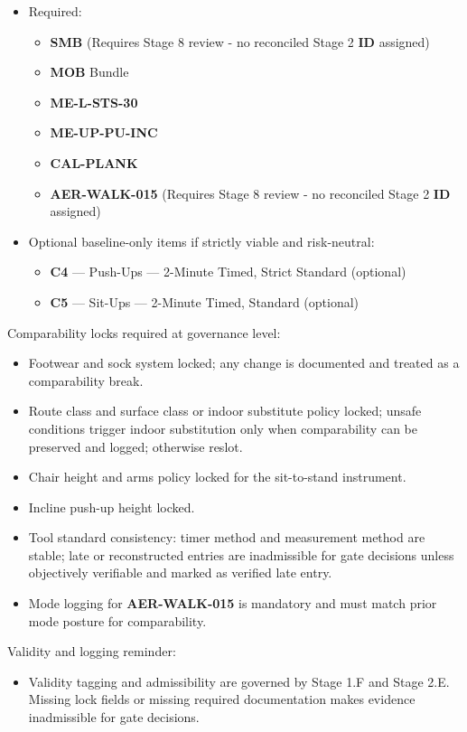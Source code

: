 \documentclass[10pt]{article}
\begin{document}
\begin{landscape}
\begin{itemize}
\item Required:
\begin{itemize}
\item \textbf{SMB} (Requires Stage 8 review - no reconciled Stage 2 \textbf{ID} assigned)
\item \textbf{MOB} Bundle
\item \textbf{ME-L-STS-30}
\item \textbf{ME-UP-PU-INC}
\item \textbf{CAL-PLANK}
\item \textbf{AER-WALK-015} (Requires Stage 8 review - no reconciled Stage 2 \textbf{ID} assigned)
\end{itemize}
\item Optional baseline-only items if strictly viable and risk-neutral:
\begin{itemize}
\item \textbf{C4} — Push-Ups — 2-Minute Timed, Strict Standard (optional)
\item \textbf{C5} — Sit-Ups — 2-Minute Timed, Standard (optional)
\end{itemize}
\end{itemize}

Comparability locks required at governance level:

\begin{itemize}
\item Footwear and sock system locked; any change is documented and treated as a comparability break.
\item Route class and surface class or indoor substitute policy locked; unsafe conditions trigger indoor substitution only when comparability can be preserved and logged; otherwise reslot.
\item Chair height and arms policy locked for the sit-to-stand instrument.
\item Incline push-up height locked.
\item Tool standard consistency: timer method and measurement method are stable; late or reconstructed entries are inadmissible for gate decisions unless objectively verifiable and marked as verified late entry.
\item Mode logging for \textbf{AER-WALK-015} is mandatory and must match prior mode posture for comparability.
\end{itemize}

Validity and logging reminder:

\begin{itemize}
\item Validity tagging and admissibility are governed by Stage 1.F and Stage 2.E. Missing lock fields or missing required documentation makes evidence inadmissible for gate decisions.
\end{itemize}

\end{landscape}
\end{document}
